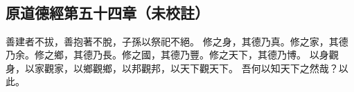 ﻿%
%

\chapter{~}

\section{原道德經第五十四章（未校註）}

\begin{withgezhu}

\zhsong


善建者不拔，善抱著不脫，子孫以祭祀不絕。
修之身，其德乃真。修之家，其德乃余。修之鄉，其德乃長。修之國，其德乃豐。修之天下，其德乃博。
以身觀身，以家觀家，以鄉觀鄉，\textcolor{tongjia-color}{以邦觀邦}，以天下觀天下。
吾何以知天下之然哉？以此。

\end{withgezhu}
